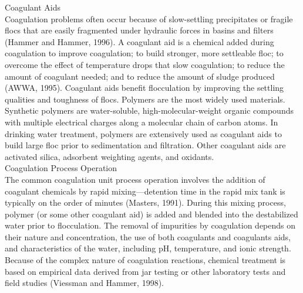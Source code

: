 Coagulant Aids\\
Coagulation problems often occur because of slow-settling precipitates or fragile flocs that are easily fragmented under hydraulic forces in basins and filters (Hammer and Hammer, 1996). A coagulant aid is a chemical added during coagulation to improve coagulation; to build stronger, more settleable floc; to overcome the effect of temperature drops that slow coagulation; to reduce the amount of coagulant needed; and to reduce the amount of sludge produced (AWWA, 1995). Coagulant aids benefit
flocculation by improving the settling qualities and toughness of flocs. Polymers are the most widely used materials. Synthetic polymers are water-soluble, high-molecular-weight organic compounds with multiple electrical charges along a molecular chain of carbon atoms. In drinking water treatment, polymers are extensively used as coagulant aids to build large floc prior to sedimentation and filtration. Other coagulant aids are activated silica, adsorbent weighting agents, and oxidants.\\

Coagulation Process Operation\\
The common coagulation unit process operation involves the addition of coagulant chemicals by rapid mixing—detention time in the rapid mix tank is typically on the order of minutes (Masters, 1991). During this mixing process, polymer (or some other coagulant aid) is added and blended into the destabilized water prior to flocculation. The removal of impurities by coagulation depends on their nature and concentration, the use of both coagulants and coagulants aids, and characteristics of the water, including pH, temperature, and ionic strength. Because of the complex nature of coagulation reactions, chemical treatment is based on empirical data derived from jar testing or other laboratory tests and field studies (Viessman and Hammer, 1998).\\

